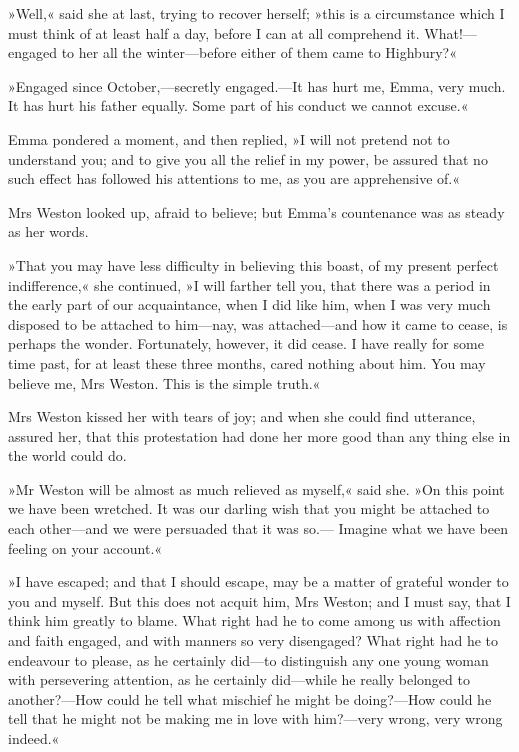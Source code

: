 »Well,« said she at last, trying to recover herself; »this is a circumstance which I must think of at least half a day, before I can at all comprehend it. What!—engaged to her all the winter—before either of them came to Highbury?«

»Engaged since October,—secretly engaged.—It has hurt me, Emma, very much. It has hurt his father equally. Some part of his conduct we cannot excuse.«

Emma pondered a moment, and then replied, »I will not pretend not to understand you; and to give you all the relief in my power, be assured that no such effect has followed his attentions to me, as you are apprehensive of.«

Mrs Weston looked up, afraid to believe; but Emma's countenance was as steady as her words.

»That you may have less difficulty in believing this boast, of my present perfect indifference,« she continued, »I will farther tell you, that there was a period in the early part of our acquaintance, when I did like him, when I was very much disposed to be attached to him—nay, was attached—and how it came to cease, is perhaps the wonder. Fortunately, however, it did cease. I have really for some time past, for at least these three months, cared nothing about him. You may believe me, Mrs Weston. This is the simple truth.«

Mrs Weston kissed her with tears of joy; and when she could find utterance, assured her, that this protestation had done her more good than any thing else in the world could do.

»Mr Weston will be almost as much relieved as myself,« said she. »On this point we have been wretched. It was our darling wish that you might be attached to each other—and we were persuaded that it was so.— Imagine what we have been feeling on your account.«

»I have escaped; and that I should escape, may be a matter of grateful wonder to you and myself. But this does not acquit him, Mrs Weston; and I must say, that I think him greatly to blame. What right had he to come among us with affection and faith engaged, and with manners so very disengaged? What right had he to endeavour to please, as he certainly did—to distinguish any one young woman with persevering attention, as he certainly did—while he really belonged to another?—How could he tell what mischief he might be doing?—How could he tell that he might not be making me in love with him?—very wrong, very wrong indeed.«

